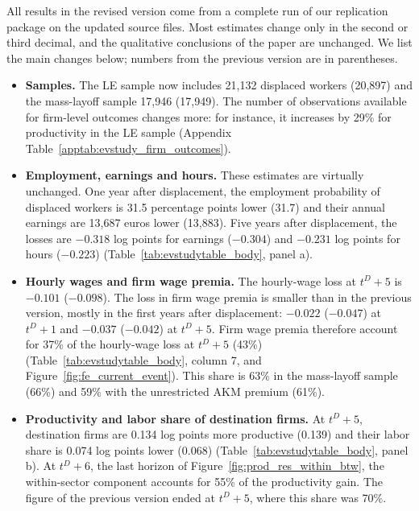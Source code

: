 \documentclass[11pt]{article}
\newcommand{\answer}[1]{\begingroup\color{navy}#1\endgroup}
\begin{document}
\answer{All results in the revised version come from a complete run of our replication package on the updated source files. Most estimates change only in the second or third decimal, and the qualitative conclusions of the paper are unchanged. We list the main changes below; numbers from the previous version are in parentheses.

\begin{itemize}[leftmargin=*]
\item \textbf{Samples.} The LE sample now includes 21,132 displaced workers (20,897) and the mass-layoff sample 17,946 (17,949). The number of observations available for firm-level outcomes changes more: for instance, it increases by 29\% for productivity in the LE sample (Appendix Table~\ref{apptab:evstudy_firm_outcomes}).

\item \textbf{Employment, earnings and hours.} These estimates are virtually unchanged. One year after displacement, the employment probability of displaced workers is 31.5 percentage points lower (31.7) and their annual earnings are 13,687 euros lower (13,883). Five years after displacement, the losses are $-0.318$ log points for earnings ($-0.304$) and $-0.231$ log points for hours ($-0.223$) (Table~\ref{tab:evstudytable_body}, panel a).

\item \textbf{Hourly wages and firm wage premia.} The hourly-wage loss at $t^D+5$ is $-0.101$ ($-0.098$). The loss in firm wage premia is smaller than in the previous version, mostly in the first years after displacement: $-0.022$ ($-0.047$) at $t^D+1$ and $-0.037$ ($-0.042$) at $t^D+5$. Firm wage premia therefore account for 37\% of the hourly-wage loss at $t^D+5$ (43\%) (Table~\ref{tab:evstudytable_body}, column 7, and Figure~\ref{fig:fe_current_event}). This share is 63\% in the mass-layoff sample (66\%) and 59\% with the unrestricted AKM premium (61\%).

\item \textbf{Productivity and labor share of destination firms.} At $t^D+5$, destination firms are 0.134 log points more productive (0.139) and their labor share is 0.074 log points lower (0.068) (Table~\ref{tab:evstudytable_body}, panel b). At $t^D+6$, the last horizon of Figure~\ref{fig:prod_res_within_btw}, the within-sector component accounts for 55\% of the productivity gain. The figure of the previous version ended at $t^D+5$, where this share was 70\%.


\end{itemize}}
\end{document}
